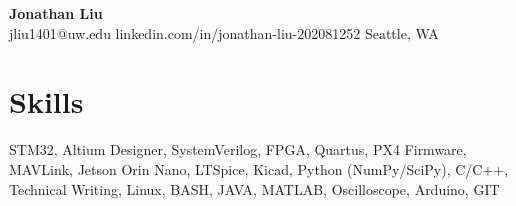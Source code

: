 \documentclass[11pt,letterpaper]{article}
\begin{document}
\begin{center}
{\LARGE \textbf{Jonathan Liu}}\\[2pt]
\small jliu1401@uw.edu \textbullet{} linkedin.com/in/jonathan-liu-202081252 \textbullet{} Seattle, WA
\end{center}
\section*{Skills}
STM32, Altium Designer, SystemVerilog, FPGA, Quartus, PX4 Firmware, MAVLink, Jetson Orin Nano, LTSpice, Kicad, Python (NumPy/SciPy), C/C++, Technical Writing, Linux, BASH, JAVA, MATLAB, Oscilloscope, Arduino, GIT
\end{document}
